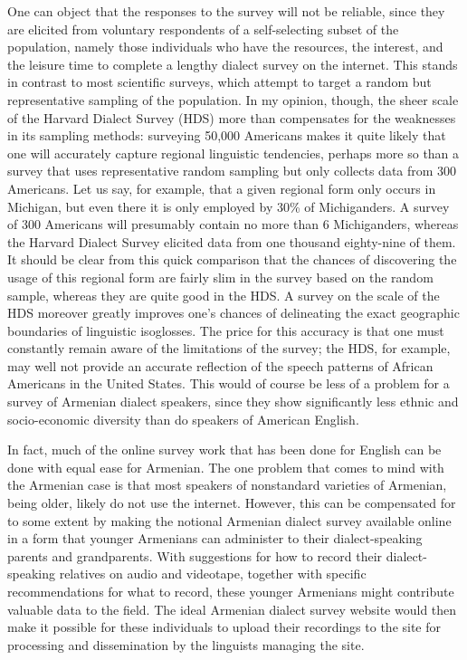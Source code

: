 One can object that the responses to the survey will not be reliable, since they are elicited from voluntary respondents of a self-selecting subset of the population, namely those individuals who have the resources, the interest, and the leisure time to complete a lengthy dialect survey on the internet. This stands in contrast to most scientific surveys, which attempt to target a random but representative sampling of the population. In my opinion, though, the sheer scale of the Harvard Dialect Survey (HDS) more than compensates for the weaknesses in its sampling methods: surveying 50,000 Americans makes it quite likely that one will accurately capture regional linguistic tendencies, perhaps more so than a survey that uses representative random sampling but only collects data from 300 Americans. Let us say, for example, that a given regional form only occurs in Michigan, but even there it is only employed by 30\% of Michiganders. A survey of 300 Americans will presumably contain no more than 6 Michiganders, whereas the Harvard Dialect Survey elicited data from one thousand eighty-nine of them. It should be clear from this quick comparison that the chances of discovering the usage of this regional form are fairly slim in the survey based on the random sample, whereas they are quite good in the HDS. A survey on the scale of the HDS moreover greatly improves one’s chances of delineating the exact geographic boundaries of linguistic isoglosses. The price for this accuracy is that one must constantly remain aware of the limitations of the survey; the HDS, for example, may well not provide an accurate reflection of the speech patterns of African Americans in the United States. This would of course be less of a problem for a survey of Armenian dialect speakers, since they show significantly less ethnic and socio-economic diversity than do speakers of American English.

In fact, much of the online survey work that has been done for English can be done with equal ease for Armenian. The one problem that comes to mind with the Armenian case is that most speakers of nonstandard varieties of Armenian, being older, likely do not use the internet. However, this can be compensated for to some extent by making the notional Armenian dialect survey available online in a form that younger Armenians can administer to their dialect-speaking parents and grandparents. With suggestions for how to record their dialect-speaking relatives on audio and videotape, together with specific recommendations for what to record, these younger Armenians might contribute valuable data to the field. The ideal Armenian dialect survey website would then make it possible for these individuals to upload their recordings to the site for processing and dissemination by the linguists managing the site.

